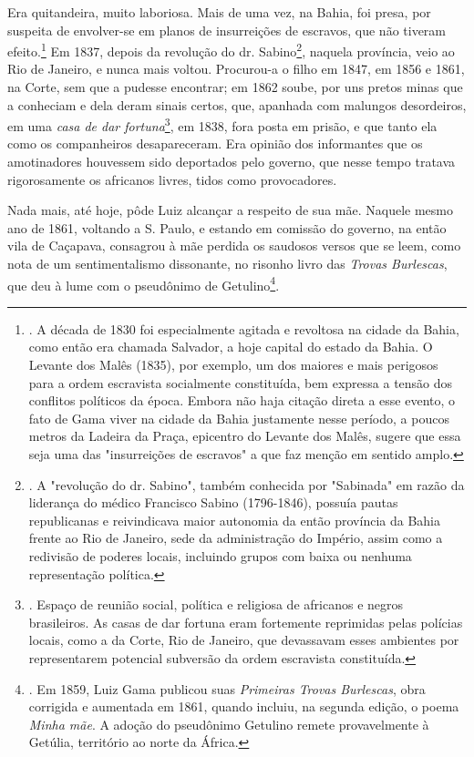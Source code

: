 Era quitandeira, muito laboriosa. Mais de uma vez, na Bahia, foi presa,
por suspeita de envolver-se em planos de insurreições de escravos, que
não tiveram efeito.\footnote{. A década de 1830 foi especialmente
  agitada e revoltosa na cidade da Bahia, como então era chamada
  Salvador, a hoje capital do estado da Bahia. O Levante dos Malês
  (1835), por exemplo, um dos maiores e mais perigosos para a ordem
  escravista socialmente constituída, bem expressa a tensão dos
  conflitos políticos da época. Embora não haja citação direta a esse
  evento, o fato de Gama viver na cidade da Bahia justamente nesse
  período, a poucos metros da Ladeira da Praça, epicentro do Levante dos
  Malês, sugere que essa seja uma das "insurreições de escravos" a que
  faz menção em sentido amplo.} Em 1837, depois da revolução do dr.
Sabino\footnote{. A "revolução do dr. Sabino", também conhecida por
  "Sabinada" em razão da liderança do médico Francisco Sabino
  (1796-1846), possuía pautas republicanas e reivindicava maior
  autonomia da então província da Bahia frente ao Rio de Janeiro, sede
  da administração do Império, assim como a redivisão de poderes locais,
  incluindo grupos com baixa ou nenhuma representação política.},
naquela província, veio ao Rio de Janeiro, e nunca mais voltou.
Procurou-a o filho em 1847, em 1856 e 1861, na Corte, sem que a pudesse
encontrar; em 1862 soube, por uns pretos minas que a conheciam e dela
deram sinais certos, que, apanhada com malungos desordeiros, em uma
\emph{casa de dar fortuna}\footnote{. Espaço de reunião social, política
  e religiosa de africanos e negros brasileiros. As casas de dar fortuna
  eram fortemente reprimidas pelas polícias locais, como a da Corte, Rio
  de Janeiro, que devassavam esses ambientes por representarem potencial
  subversão da ordem escravista constituída.}, em 1838, fora posta em
prisão, e que tanto ela como os companheiros desapareceram. Era opinião
dos informantes que os amotinadores houvessem sido deportados pelo
governo, que nesse tempo tratava rigorosamente os africanos livres,
tidos como provocadores.

Nada mais, até hoje, pôde Luiz alcançar a respeito de sua mãe. Naquele
mesmo ano de 1861, voltando a S. Paulo, e estando em comissão do
governo, na então vila de Caçapava, consagrou à mãe perdida os saudosos
versos que se leem, como nota de um sentimentalismo dissonante, no
risonho livro das \emph{Trovas Burlescas}, que deu à lume com o
pseudônimo de Getulino\footnote{. Em 1859, Luiz Gama publicou suas
  \emph{Primeiras Trovas Burlescas}, obra corrigida e aumentada em 1861,
  quando incluiu, na segunda edição, o poema \emph{Minha mãe}. A adoção
  do pseudônimo Getulino remete provavelmente à Getúlia, território ao
  norte da África.}.

